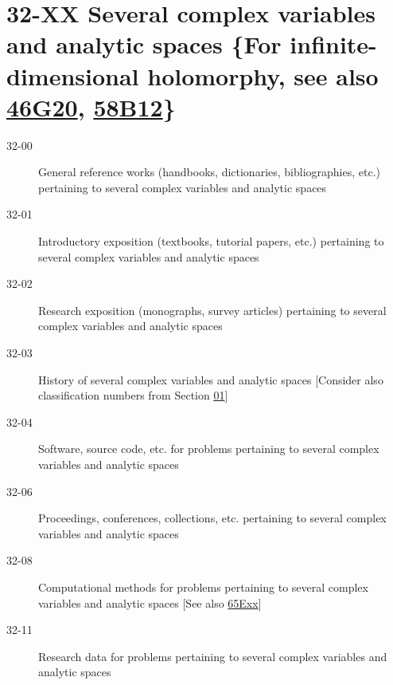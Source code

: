 \documentclass[letterpaper]{article}
\begin{document}
\section*{32-XX  Several complex variables and analytic spaces \{For infinite-\newline dimensional holomorphy, see also \hyperref[46G20]{46G20}, \hyperref[58B12]{58B12}\} }\label{32-XX}
\begin{description}
\item [32-00]\label{32-00} General reference works (handbooks, dictionaries, bibliographies, etc.) pertaining to several complex variables and analytic spaces
\item [32-01]\label{32-01} Introductory exposition (textbooks, tutorial papers, etc.) pertaining to several complex variables and analytic spaces
\item [32-02]\label{32-02} Research exposition (monographs, survey articles) pertaining to several complex variables and analytic spaces
\item [32-03]\label{32-03} History of several complex variables and analytic spaces [Consider also classification numbers from Section \hyperref[01-XX]{01}]
\item [32-04]\label{32-04} Software, source code, etc. for problems pertaining to several complex variables and analytic spaces
\item [32-06]\label{32-06} Proceedings, conferences, collections, etc. pertaining to several complex variables and analytic spaces
\item [32-08]\label{32-08} Computational methods for problems pertaining to several complex variables and analytic spaces [See also \hyperref[65Exx]{65Exx}]
\item [32-11]\label{32-11} Research data for problems pertaining to several complex variables and analytic spaces
\end{description}
\end{document}
